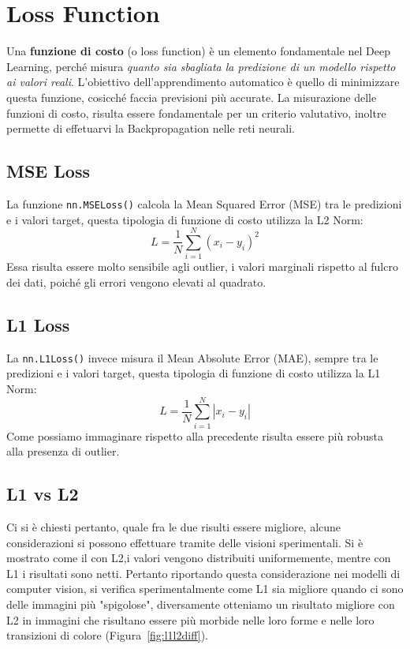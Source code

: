 \chapter{Loss Function}
Una \textbf{funzione di costo} (o loss function) è un elemento fondamentale nel Deep Learning, perché misura \textit{quanto sia sbagliata la predizione di un modello rispetto ai valori reali}. L'obiettivo dell'apprendimento automatico è quello di minimizzare questa funzione, cosicché faccia previsioni più accurate. La misurazione delle funzioni di costo, risulta essere fondamentale per un criterio valutativo, inoltre permette di effetuarvi la Backpropagation nelle reti neurali.
\section{MSE Loss}
La funzione \texttt{nn.MSELoss()} calcola la Mean Squared Error (MSE) tra le predizioni e i valori target, questa tipologia di funzione di costo utilizza la L2 Norm:
\begin{equation}
L = \frac{1}{N} \sum_{i=1}^{N} (x_i - y_i)^2
\end{equation}
Essa risulta essere molto sensibile agli outlier, i valori marginali rispetto al fulcro dei dati, poiché gli errori vengono elevati al quadrato.
\section{L1 Loss}
La \texttt{nn.L1Loss()} invece misura il Mean Absolute Error (MAE), sempre tra le predizioni e i valori target, questa tipologia di funzione di costo utilizza la L1 Norm:
\begin{equation}
L = \frac{1}{N} \sum_{i=1}^{N} |x_i - y_i|
\end{equation}
Come possiamo immaginare rispetto alla precedente risulta essere più robusta alla presenza di outlier.
\section{L1 vs L2}
Ci si è chiesti pertanto, quale fra le due risulti essere migliore, alcune considerazioni si possono effettuare tramite delle visioni sperimentali. Si è mostrato come il con L2,i valori vengono distribuiti uniformemente, mentre con L1 i risultati sono netti. Pertanto riportando questa considerazione nei modelli di computer vision, si verifica sperimentalmente come L1 sia migliore quando ci sono delle immagini più "spigolose", diversamente otteniamo un risultato migliore con L2 in immagini che risultano essere più morbide nelle loro forme e nelle loro transizioni di colore (Figura~\ref{fig:l1l2diff}).

